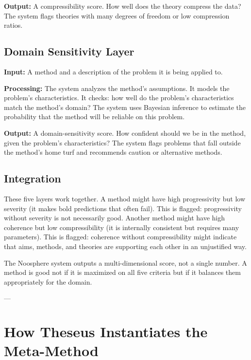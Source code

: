 \documentclass[11pt,letterpaper]{article}
\begin{document}
\textbf{Output:} A compressibility score. How well does the theory compress the data? The system flags theories with many degrees of freedom or low compression ratios.

\subsection*{Domain Sensitivity Layer}

\textbf{Input:} A method and a description of the problem it is being applied to.

\textbf{Processing:} The system analyzes the method's assumptions. It models the problem's characteristics. It checks: how well do the problem's characteristics match the method's domain? The system uses Bayesian inference to estimate the probability that the method will be reliable on this problem.

\textbf{Output:} A domain-sensitivity score. How confident should we be in the method, given the problem's characteristics? The system flags problems that fall outside the method's home turf and recommends caution or alternative methods.

\subsection*{Integration}

These five layers work together. A method might have high progressivity but low severity (it makes bold predictions that often fail). This is flagged: progressivity without severity is not necessarily good. Another method might have high coherence but low compressibility (it is internally consistent but requires many parameters). This is flagged: coherence without compressibility might indicate that aims, methods, and theories are supporting each other in an unjustified way.

The Noosphere system outputs a multi-dimensional score, not a single number. A method is good not if it is maximized on all five criteria but if it balances them appropriately for the domain.

---

\newpage


\section{How Theseus Instantiates the Meta-Method}
\end{document}
